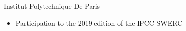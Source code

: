 

{Institut Polytechnique De Paris }{}
{\begin{itemize}
    \item Participation to the 2019 edition of the IPCC SWERC
\end{itemize}}